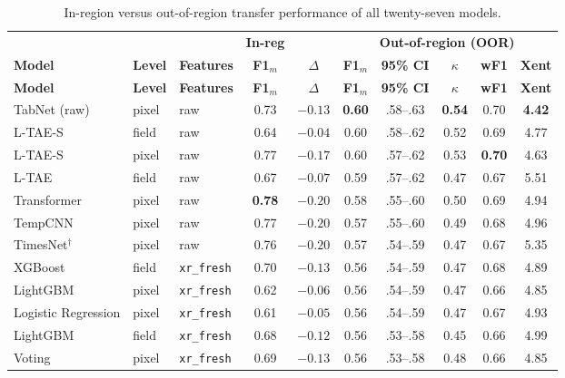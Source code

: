 \documentclass[preprint,authoryear]{elsarticle}
\begin{document}
\begingroup
\scriptsize
\renewcommand{\arraystretch}{1.1}
\setlength{\tabcolsep}{4pt}
\begin{longtable}{lllccccccc}
\caption{In-region versus out-of-region transfer performance of all twenty-seven models.}
\label{tab:gap}\\
\toprule
 & & & \textbf{In-reg} & & \multicolumn{5}{c}{\textbf{Out-of-region (OOR)}} \\
\cmidrule(lr){4-4}\cmidrule(lr){6-10}
\textbf{Model} & \textbf{Level} & \textbf{Features} & \textbf{F1$_m$} & \textbf{$\Delta$} & \textbf{F1$_m$} & \textbf{95\% CI} & \textbf{$\kappa$} & \textbf{wF1} & \textbf{Xent} \\
\midrule
\endfirsthead
\toprule
\textbf{Model} & \textbf{Level} & \textbf{Features} & \textbf{F1$_m$} & \textbf{$\Delta$} & \textbf{F1$_m$} & \textbf{95\% CI} & \textbf{$\kappa$} & \textbf{wF1} & \textbf{Xent} \\
\midrule
\endhead
\bottomrule
\endfoot
TabNet (raw)          & pixel & raw & 0.73 & $-0.13$ & \textbf{0.60} & .58--.63 & \textbf{0.54} & 0.70 & \textbf{4.42} \\
L-TAE-S               & field & raw & 0.64 & $\mathbf{-0.04}$ & 0.60 & .58--.62 & 0.52 & 0.69 & 4.77 \\
L-TAE-S               & pixel & raw & 0.77 & $-0.17$ & 0.60 & .57--.62 & 0.53 & \textbf{0.70} & 4.63 \\
L-TAE                 & field & raw & 0.67 & $-0.07$ & 0.59 & .57--.62 & 0.47 & 0.67 & 5.51 \\
Transformer           & pixel & raw & \textbf{0.78} & $-0.20$ & 0.58 & .55--.60 & 0.50 & 0.69 & 4.94 \\
TempCNN               & pixel & raw & 0.77 & $-0.20$ & 0.57 & .55--.60 & 0.49 & 0.68 & 4.96 \\
TimesNet$^{\dagger}$ & pixel & raw & 0.76 & $-0.20$ & 0.57 & .54--.59 & 0.47 & 0.67 & 5.35 \\
XGBoost               & field & \texttt{xr\_fresh} & 0.70 & $-0.13$ & 0.56 & .54--.59 & 0.47 & 0.68 & 4.89 \\
LightGBM              & pixel & \texttt{xr\_fresh} & 0.62 & $-0.06$ & 0.56 & .54--.59 & 0.47 & 0.66 & 4.85 \\
Logistic Regression   & pixel & \texttt{xr\_fresh} & 0.61 & $-0.05$ & 0.56 & .54--.59 & 0.47 & 0.67 & 4.93 \\
LightGBM              & field & \texttt{xr\_fresh} & 0.68 & $-0.12$ & 0.56 & .53--.58 & 0.45 & 0.66 & 4.99 \\
Voting                & pixel & \texttt{xr\_fresh} & 0.69 & $-0.13$ & 0.56 & .53--.58 & 0.48 & 0.66 & 4.85 \\

\end{longtable}
\end{document}
